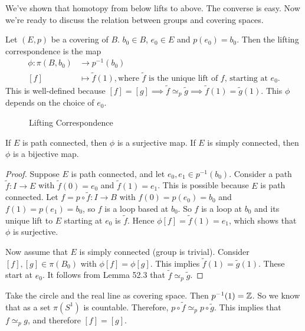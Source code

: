 We've shown that homotopy from below lifts to above.  The converse is easy.
Now we're ready to discuss the relation between groups and covering spaces.

\begin{definition}
    Let $(E, p)$ be a covering of $B$. $b_0 \in B$, $e_0 \in E$ and $p(e_0) = b_0$.
    Then the lifting correspondence is the map  
    \begin{align*}
        \phi: \pi(B, b_0) &\longrightarrow p^{-1}(b_0) \\
        [f]&\longmapsto \tilde f(1), \text{where $\tilde f$ is the unique lift of $f$, starting at $e_0$}
    .\end{align*}
    This is well-defined because $[f] = [g] \implies \tilde f \simeq_p  \tilde g \implies \tilde f(1) = \tilde g(1)$.
    This $\phi$ depends on the choice of $e_0$.
\end{definition}

\begin{figure}[ht]
    \centering
    \caption{Lifting Correspondence}
    \label{fig:lifting-correspondence}
\end{figure}

\begin{theorem}[54.4]
    If $E$ is path connected, then $\phi$ is a surjective map.
    If $E$ is simply connected, then $\phi$ is a bijective map.
\end{theorem}
\begin{proof}
    Suppose $E$ is path connected, and let $e_0, e_1 \in p ^{-1} (b_0)$.
    Consider a path $\tilde f: I \to  E$ with $\tilde f(0) = e_0$ and $\tilde f(1) = e_1$. This is possible because $E$ is path connected.
    Let $f = p  \circ \tilde f: I \to B$ with $f(0) = p(e_0) = b_0$ and $f(1) = p(e_1) = b_0$, so $f$ is a loop based at  $b_0$.
    So $f$ is a loop at $b_0$ and its unique lift to $E$ starting at $e_0$ is $\tilde f$.
    Hence  $\phi[f] = \tilde f(1) = e_1$,
    which shows that $\phi$ is surjective.

    Now assume that $E$ is simply connected (group is trivial).
    Consider $[f], [g] \in \pi(B_0)$ with $\phi[f] = \phi[g]$.
    This implies  $\tilde f(1) = \tilde g(1)$.
    These start at $e_0$.
    It follows from Lemma 52.3 that $\tilde f \simeq_p \tilde g$.
\end{proof}

\begin{eg}
    Take the circle and the real line as covering space. Then $p ^{-1}(1) = \mathbb{Z}$.
    So we know that as a set $\pi(S^{1})$ is countable.
    Therefore, $p  \circ  \tilde f \simeq_p p  \circ  \tilde g $.
    This implies that $f \simeq_p  g$, and therefore $[f] = [g]$.
\end{eg}

